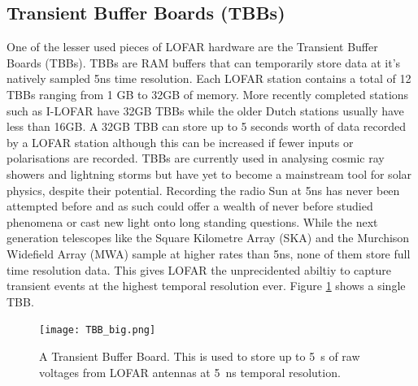 \subsection{Transient Buffer Boards (TBBs)}
\label{sec:tbb}
One of the lesser used pieces of LOFAR hardware are the Transient Buffer Boards (TBBs). TBBs are RAM buffers that can temporarily store data at it's natively sampled 5ns time resolution. Each LOFAR station contains a total of 12 TBBs ranging from 1 GB to 32GB of memory. More recently completed stations such as I-LOFAR have 32GB TBBs while the older Dutch stations usually have less than 16GB.
A 32GB TBB can store up to 5 seconds worth of data recorded by a LOFAR station although this can be increased if fewer inputs or polarisations are recorded. TBBs are currently used in analysing cosmic ray showers \citep{Mulrey2020} and lightning storms \citep{Hare2018} but have yet to become a mainstream tool for solar physics, despite their potential. 
Recording the radio Sun at 5ns has never been attempted before and as such could offer a wealth of never before studied phenomena or cast new light onto long standing questions.
While the next generation telescopes like the Square Kilometre Array (SKA) and the Murchison Widefield Array (MWA) sample at higher rates than 5ns, none of them store full time resolution data. This gives LOFAR the unprecidented abiltiy to capture transient events at the highest temporal resolution ever. Figure \ref{fig:TBB} shows a single TBB.

\begin{figure}[ht]
\centering
\texttt{[image: TBB\_big.png]}
\caption[A Transient Buffer Board.]{A Transient Buffer Board. This is used to store up to 5~s of raw voltages from LOFAR antennas at 5~ns temporal resolution.}
\label{fig:TBB}
\end{figure}


